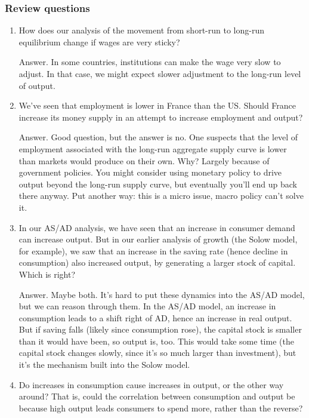 \documentclass[letterpaper,12pt]{article}
\begin{document}
\subsubsection*{Review questions}

\begin{enumerate}
\item How does our analysis of the movement from short-run to long-run
 equilibrium change if wages are very sticky?

Answer.  In some countries, institutions can make the wage very slow to adjust.
In that case, we might expect slower adjustment to the long-run
level of output.

\item We've seen that employment is lower in France than the US.
Should France increase its money supply in an attempt to increase
employment and output?

Answer.  Good question, but the answer is no.
One suspects that the level of employment
associated with the long-run aggregate supply curve is lower than
markets would produce on their own.
Why?  Largely because of government policies.
You might consider using monetary policy to drive output beyond the
long-run supply curve, but eventually you'll end up back there anyway.
Put another way:  this is a micro issue, macro policy can't solve it.

\item In our AS/AD analysis, we have seen that an increase in
consumer demand can increase output.
But in our earlier analysis of growth (the Solow model, for example),
we saw that an increase in the saving rate (hence decline in consumption)
also increased output, by generating a larger stock of capital.
Which is right?

Answer.  Maybe both.  It's hard to put these dynamics into the
AS/AD model, but we can reason through them.
In the AS/AD model, an increase in consumption leads to
a shift right of AD, hence an increase in real output.
But if saving falls (likely since consumption rose),
the capital stock is smaller than it would have been,
so output is, too.
This would take some time (the capital stock changes slowly,
since it's so much larger than investment), but it's the mechanism
built into the Solow model.


\item Do increases in consumption cause increases in output,
or the other way around?
That is, could the correlation between consumption and output be because
high output leads consumers to spend more, rather than the reverse?


\end{enumerate}
\end{document}
